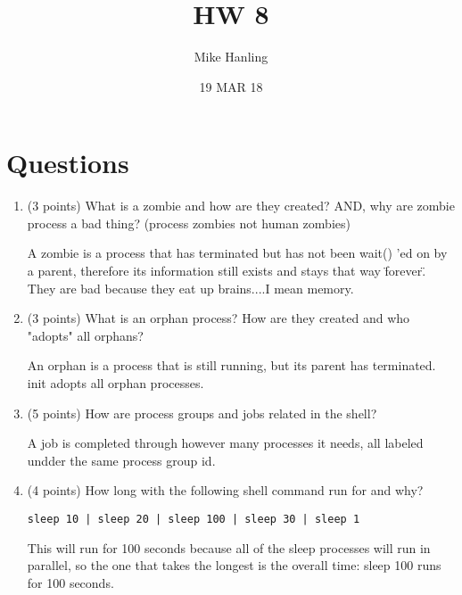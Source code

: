 \documentclass{article}[9pt]
\title{HW 8}
\author{Mike Hanling}
\date{19 MAR 18}
\newenvironment{answerfont}{\fontfamily{qhv}\selectfont}{\par}
\newenvironment{myanswer}{\begin{mdframed}\begin{answerfont}}{\end{answerfont}\end{mdframed}}
\begin{document}
\maketitle
\section*{Questions}
\label{sec:org3ac93b9}

\begin{enumerate}
\item (3 points) What is a zombie and how are they created? AND, why are zombie
process a bad thing? (process zombies not human zombies)

  \begin{myanswer}
    A zombie is a process that has terminated but has not been wait()
    'ed on by a parent, therefore its information still exists and stays
    that way \"forever\". They are bad because they eat up
    brains....I mean memory.
  \end{myanswer}


\item (3 points) What is an orphan process? How are they created and who "adopts"
all orphans?

  \begin{myanswer}
    An orphan is a process that is still running, but its parent has
    terminated.  init adopts all orphan processes.
  \end{myanswer}

\item (5 points) How are process groups and jobs related in the shell?

  \begin{myanswer}
    A job is completed through however many processes it needs, all
    labeled undder the same process group id.
  \end{myanswer}

\item (4 points) How long with the following shell command  run for and why?

\begin{verbatim}
sleep 10 | sleep 20 | sleep 100 | sleep 30 | sleep 1
\end{verbatim}

  \begin{myanswer}
    This will run for 100 seconds because all of the sleep processes
    will run in parallel, so the one that takes the longest is the
    overall time: sleep 100 runs for 100 seconds.
  \end{myanswer}


\end{enumerate}
\end{document}
